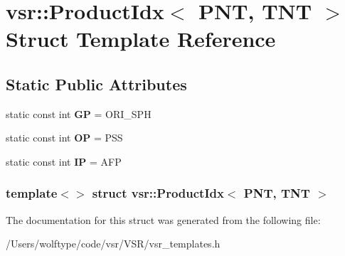 \hypertarget{structvsr_1_1_product_idx_3_01_p_n_t_00_01_t_n_t_01_4}{\section{vsr\-:\-:Product\-Idx$<$ P\-N\-T, T\-N\-T $>$ Struct Template Reference}
\label{structvsr_1_1_product_idx_3_01_p_n_t_00_01_t_n_t_01_4}
}
\subsection*{Static Public Attributes}
\begin{DoxyCompactItemize}
\item 
\hypertarget{structvsr_1_1_product_idx_3_01_p_n_t_00_01_t_n_t_01_4_af4756e7136937962b21e6b56804c13c3}{static const int {\bfseries G\-P} = O\-R\-I\-\_\-\-S\-P\-H}\label{structvsr_1_1_product_idx_3_01_p_n_t_00_01_t_n_t_01_4_af4756e7136937962b21e6b56804c13c3}

\item 
\hypertarget{structvsr_1_1_product_idx_3_01_p_n_t_00_01_t_n_t_01_4_aae7390f99f05b178d1d149affd9be0f2}{static const int {\bfseries O\-P} = P\-S\-S}\label{structvsr_1_1_product_idx_3_01_p_n_t_00_01_t_n_t_01_4_aae7390f99f05b178d1d149affd9be0f2}

\item 
\hypertarget{structvsr_1_1_product_idx_3_01_p_n_t_00_01_t_n_t_01_4_af12bba1249a788ddfe92baee379edc9c}{static const int {\bfseries I\-P} = A\-F\-P}\label{structvsr_1_1_product_idx_3_01_p_n_t_00_01_t_n_t_01_4_af12bba1249a788ddfe92baee379edc9c}

\end{DoxyCompactItemize}
\subsubsection*{template$<$$>$ struct vsr\-::\-Product\-Idx$<$ P\-N\-T, T\-N\-T $>$}



The documentation for this struct was generated from the following file\-:\begin{DoxyCompactItemize}
\item 
/\-Users/wolftype/code/vsr/\-V\-S\-R/vsr\-\_\-templates.\-h\end{DoxyCompactItemize}
